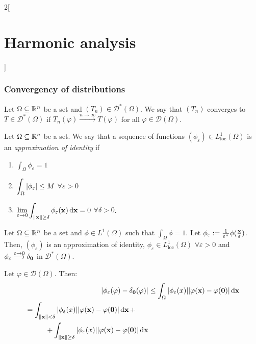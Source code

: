 \documentclass[../../../main_math.tex]{subfiles}
\begin{document}
\begin{multicols}{2}[\section{Harmonic analysis}]
  \subsubsection{Convergency of distributions}
  \begin{definition}
    Let $\Omega\subseteq \mathbb{R}^n$ be a set and $(T_n)\in \mathcal{D}^*(\Omega)$. We say that $(T_n)$ converges to $T\in\mathcal{D}^*(\Omega)$ if $T_n(\varphi)\overset{n\to\infty}{\longrightarrow}T(\varphi)$ for all $\varphi\in\mathcal{D}(\Omega)$.
  \end{definition}
  \begin{definition}
    Let $\Omega\subseteq \mathbb{R}^n$ be a set. We say that a sequence of functions $(\phi_\varepsilon)\in L_\mathrm{loc}^1(\Omega)$ is an \emph{approximation of identity} if
    \begin{enumerate}
      \item $\displaystyle\int_\Omega \phi_\varepsilon=1$
      \item $\displaystyle\int_\Omega \abs{\phi_\varepsilon}\leq M$ $\forall \varepsilon>0$
      \item $\displaystyle\lim_{\varepsilon\to 0}\int_{\left\|\boldsymbol{\mathrm{x}}\right\|\geq \delta}\phi_\varepsilon(\boldsymbol{\mathrm{x}})\dd{\boldsymbol{\mathrm{x}}}=0$ $\forall \delta>0$.
    \end{enumerate}
  \end{definition}
  \begin{proposition}
    Let $\Omega\subseteq \mathbb{R}^n$ be a set and $\phi\in L^1(\Omega)$ such that $\int_\Omega\phi=1$. Let $\phi_\varepsilon:=\frac{1}{\varepsilon^n}\phi(\frac{\boldsymbol{\mathrm{x}}}{\varepsilon})$. Then, $(\phi_\varepsilon)$ is an approximation of identity, $\phi_\varepsilon \in L_\mathrm{loc}^1(\Omega)$ $\forall \varepsilon>0$ and $\phi_\varepsilon\overset{\varepsilon\to 0}{\longrightarrow} \delta_{\boldsymbol{\mathrm{0}}}$ in $\mathcal{D}^*(\Omega)$.
  \end{proposition}
  \begin{sproof}
    Let $\varphi\in\mathcal{D}(\Omega)$. Then:
    \begin{align*}
      \abs{\phi_\varepsilon(\varphi)-\delta_{\vf{0}}(\varphi)} & \leq \int_\Omega \abs{\phi_\varepsilon(x)}\abs{\varphi(\vf{x})-\varphi(\vf{0})}\dd{\vf{x}} \\
      \begin{split}
        & =\int_{\norm{\vf{x}}<\delta} \abs{\phi_\varepsilon(x)}\abs{\varphi(\vf{x})-\varphi(\vf{0})}\dd{\vf{x}}+\\
        &\hspace{1cm}+\int_{\norm{\vf{x}}\geq\delta} \abs{\phi_\varepsilon(x)}\abs{\varphi(\vf{x})-\varphi(\vf{0})}\dd{\vf{x}}

\end{split}
\end{align*}
\end{sproof}
\end{multicols}
\end{document}
